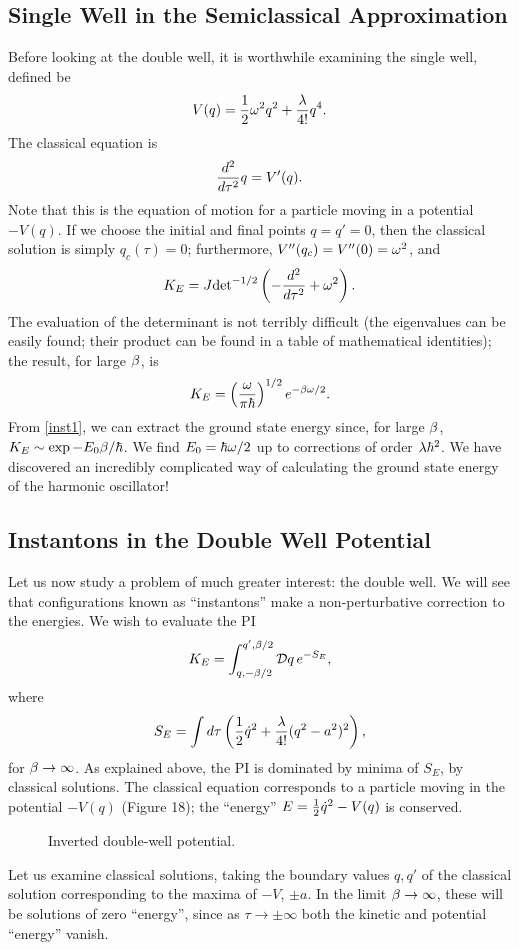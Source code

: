 \documentclass[12pt]{article}
\begin{document}
\subsection{Single Well in the Semiclassical Approximation}
Before looking at the double well, it is worthwhile examining the
single well, defined be
\[
V(q)={\frac 12}{\omega}^2q^2+{\lambda\over4!}q^4.
\]
The classical equation is
\[
{d^2\over d\tau^2}q=V'(q).
\]
Note that this is the equation of motion for a particle moving in a
potential $-V(q)$. If we choose the initial and final points $q=q'=0$,
then the classical solution is simply $q_c(\tau)=0$; furthermore,
$V''(q_c)=V''(0)={\omega}^2$, and
\[
K_E=J{\det}^{-1/2}\left(-{d^2\over d\tau^2}+{\omega}^2\right).
\]
The evaluation of the determinant is not terribly difficult (the
eigenvalues can be easily found; their product can be found in a table
of mathematical identities); the result, for large ${\beta}$, is
\[
K_E=\left({{\omega}\over\pi\hbar}\right)^{1/2}e^{-{\beta}{\omega}/2}.
\]
From \eqref{inst1}, we can extract the ground state energy since, for
large ${\beta}$, $K_E\sim\exp-E_0{\beta}/\hbar$. We find $E_0=\hbar{\omega}/2$ up to
corrections of order $\lambda\hbar^2$. We have discovered an incredibly
complicated way of calculating the ground state energy of the harmonic
oscillator!

\subsection{Instantons in the Double Well Potential}
Let us now study a problem of much greater
interest: the double well. We will see
that configurations known as ``instantons'' make a non-perturbative
correction to the energies. We wish to evaluate the PI
\[
K_E=\int_{q,-\be/2}^{q',\be/2}\DD q\,e^{-S_E},
\]
where
\[
S_E=\int d\tau\left({\frac 12}{\dot q}^2+{\lambda\over4!}(q^2-a^2)^2\right),
\]
for ${\beta}\to\infty$. As explained above, the PI is dominated by minima
of $S_E$, \ie by classical solutions. The classical equation
corresponds to a particle moving in the potential $-V(q)$
(Figure 18); the ``energy'' $E={\frac 12}{\dot q}^2-V(q)$ is conserved.

\begin{figure}[hb]
\epsfysize=5cm
\centerline{}
\caption{Inverted double-well potential.}
\end{figure}


Let us examine classical solutions, taking the boundary values $q,q'$
of the classical solution corresponding to the maxima of $-V$, $\pm
a$. In the limit ${\beta}\to\infty$, these will be solutions of zero
``energy'', since as $\tau\to\pm\infty$ both the kinetic and potential
``energy'' vanish.
\end{document}
